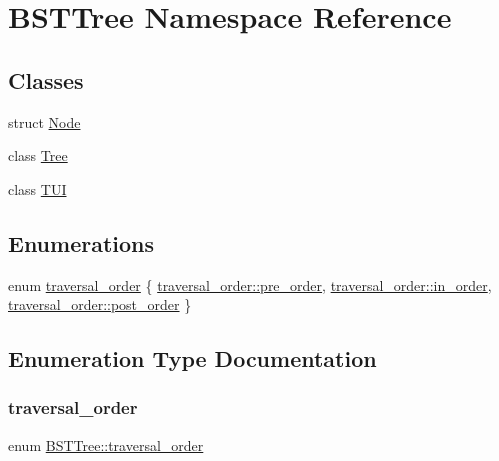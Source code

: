 \hypertarget{namespace_b_s_t_tree}{}\section{B\+S\+T\+Tree Namespace Reference}
\label{namespace_b_s_t_tree}
\subsection*{Classes}
\begin{DoxyCompactItemize}
\item 
struct \mbox{\hyperlink{struct_b_s_t_tree_1_1_node}{Node}}
\item 
class \mbox{\hyperlink{class_b_s_t_tree_1_1_tree}{Tree}}
\item 
class \mbox{\hyperlink{class_b_s_t_tree_1_1_t_u_i}{T\+UI}}
\end{DoxyCompactItemize}
\subsection*{Enumerations}
\begin{DoxyCompactItemize}
\item 
enum \mbox{\hyperlink{namespace_b_s_t_tree_a711723b85e5af09e10bfcc3a3b501fe2}{traversal\+\_\+order}} \{ \mbox{\hyperlink{namespace_b_s_t_tree_a711723b85e5af09e10bfcc3a3b501fe2ae4af3df647b822b68959104968efb59f}{traversal\+\_\+order\+::pre\+\_\+order}}, 
\mbox{\hyperlink{namespace_b_s_t_tree_a711723b85e5af09e10bfcc3a3b501fe2af51b25ca6f591d130cd0b575bf7821b3}{traversal\+\_\+order\+::in\+\_\+order}}, 
\mbox{\hyperlink{namespace_b_s_t_tree_a711723b85e5af09e10bfcc3a3b501fe2a84b773bcd444d91fbfb781b30f51b0e3}{traversal\+\_\+order\+::post\+\_\+order}}
 \}
\end{DoxyCompactItemize}


\subsection{Enumeration Type Documentation}
\mbox{\label{namespace_b_s_t_tree_a711723b85e5af09e10bfcc3a3b501fe2}} 
\subsubsection{\texorpdfstring{traversal\+\_\+order}{traversal\_order}}
{\footnotesize\ttfamily enum \mbox{\hyperlink{namespace_b_s_t_tree_a711723b85e5af09e10bfcc3a3b501fe2}{B\+S\+T\+Tree\+::traversal\+\_\+order}}\hspace{0.3cm}{\ttfamily [strong]}}

